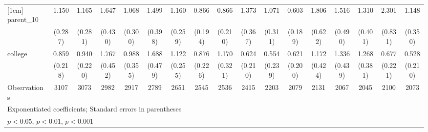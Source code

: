 {\begin{tabular}{l*{16}{c}}
[1em]
parent\_10           &       1.150         &       1.165         &       1.647         &       1.068         &       1.499         &       1.160         &       0.866         &       0.866         &       1.373         &       1.071         &       0.603         &       1.806         &       1.516         &       1.310         &       2.301\sym{*}  &       1.148         \\
                    &     (0.287)         &     (0.281)         &     (0.430)         &     (0.300)         &     (0.398)         &     (0.259)         &     (0.194)         &     (0.210)         &     (0.367)         &     (0.311)         &     (0.189)         &     (0.622)         &     (0.490)         &     (0.401)         &     (0.831)         &     (0.350)         \\
[1em]
college             &       0.859         &       0.940         &       1.767\sym{*}  &       0.988         &       1.688         &       1.122         &       0.876         &       1.170         &       0.624         &       0.554         &       0.621         &       1.172         &       1.336         &       1.268         &       0.677         &       0.528         \\
                    &     (0.218)         &     (0.220)         &     (0.452)         &     (0.355)         &     (0.479)         &     (0.255)         &     (0.226)         &     (0.321)         &     (0.210)         &     (0.239)         &     (0.200)         &     (0.424)         &     (0.439)         &     (0.381)         &     (0.221)         &     (0.210)         \\
\hline
Observations        &        3107         &        3073         &        2982         &        2917         &        2789         &        2651         &        2545         &        2536         &        2415         &        2203         &        2079         &        2131         &        2067         &        2045         &        2100         &        2073         \\
\hline\hline
\multicolumn{17}{l}{\footnotesize Exponentiated coefficients; Standard errors in parentheses}\\
\multicolumn{17}{l}{\footnotesize \sym{*} \(p<0.05\), \sym{**} \(p<0.01\), \sym{***} \(p<0.001\)}\\
\end{tabular}
}
